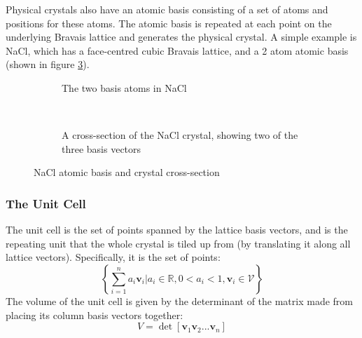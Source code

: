 \documentclass[12pt]{article}
\begin{document}
Physical crystals also have an atomic basis consisting of a set of atoms and positions for these atoms. The atomic basis is repeated at each point on the underlying Bravais lattice and generates the physical crystal. 
A simple example is NaCl, which has a face-centred cubic Bravais lattice, and a 2 atom atomic basis (shown in figure \ref{fig:nacl_lattice}).
\begin{figure}[t!]
    \centering
    \begin{subfigure}[t]{0.5\linewidth}
    \centering
        \caption{The two basis atoms in NaCl}
	\label{fig:nacl_basis}
    \end{subfigure}%
    ~ 
    \begin{subfigure}[t]{0.5\linewidth}
        \centering
{}
        \caption{A cross-section of the NaCl crystal, showing two of the three basis vectors}
	\label{fig:nacl_crosssection}
    \end{subfigure}
    \caption{NaCl atomic basis and crystal cross-section}
\label{fig:nacl_lattice}
\end{figure}
\subsubsection{The Unit Cell}
The unit cell is the set of points spanned by the lattice basis vectors, and is the repeating unit that the whole crystal is tiled up from (by translating it along all lattice vectors). Specifically, it is the set of points:
\begin{equation}\label{eq:unit_cell}
	\left\{\sum _{i=1}^n a_i \mathbf v_i \Big| a_i \in \mathbb{R}, 0<a_i<1, \mathbf{v}_i \in \mathcal V \right\}
\end{equation}
The volume of the unit cell is given by the determinant of the matrix made from placing its column basis vectors together:
\begin{equation}
	V = \det [\mathbf{v}_1 \mathbf{v}_2 ... \mathbf{v}_n]
\end{equation}
\end{document}
